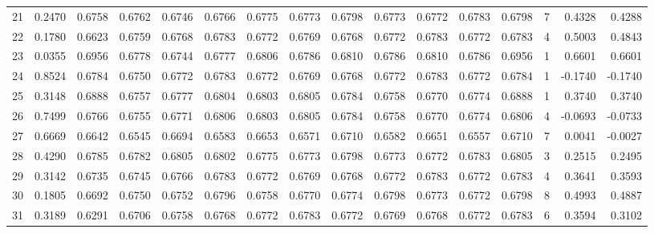 \begin{tabular}{lrrrrrrrrrrrrrrr}
21  &      0.2470 &  0.6758 &  0.6762 &  0.6746 &  0.6766 &  0.6775 &  0.6773 &  0.6798 &  0.6773 &  0.6772 &   0.6783 &     0.6798 &      7 &                    0.4328 &                     0.4288 \\
22  &      0.1780 &  0.6623 &  0.6759 &  0.6768 &  0.6783 &  0.6772 &  0.6769 &  0.6768 &  0.6772 &  0.6783 &   0.6772 &     0.6783 &      4 &                    0.5003 &                     0.4843 \\
23  &      0.0355 &  0.6956 &  0.6778 &  0.6744 &  0.6777 &  0.6806 &  0.6786 &  0.6810 &  0.6786 &  0.6810 &   0.6786 &     0.6956 &      1 &                    0.6601 &                     0.6601 \\
24  &      0.8524 &  0.6784 &  0.6750 &  0.6772 &  0.6783 &  0.6772 &  0.6769 &  0.6768 &  0.6772 &  0.6783 &   0.6772 &     0.6784 &      1 &                   -0.1740 &                    -0.1740 \\
25  &      0.3148 &  0.6888 &  0.6757 &  0.6777 &  0.6804 &  0.6803 &  0.6805 &  0.6784 &  0.6758 &  0.6770 &   0.6774 &     0.6888 &      1 &                    0.3740 &                     0.3740 \\
26  &      0.7499 &  0.6766 &  0.6755 &  0.6771 &  0.6806 &  0.6803 &  0.6805 &  0.6784 &  0.6758 &  0.6770 &   0.6774 &     0.6806 &      4 &                   -0.0693 &                    -0.0733 \\
27  &      0.6669 &  0.6642 &  0.6545 &  0.6694 &  0.6583 &  0.6653 &  0.6571 &  0.6710 &  0.6582 &  0.6651 &   0.6557 &     0.6710 &      7 &                    0.0041 &                    -0.0027 \\
28  &      0.4290 &  0.6785 &  0.6782 &  0.6805 &  0.6802 &  0.6775 &  0.6773 &  0.6798 &  0.6773 &  0.6772 &   0.6783 &     0.6805 &      3 &                    0.2515 &                     0.2495 \\
29  &      0.3142 &  0.6735 &  0.6745 &  0.6766 &  0.6783 &  0.6772 &  0.6769 &  0.6768 &  0.6772 &  0.6783 &   0.6772 &     0.6783 &      4 &                    0.3641 &                     0.3593 \\
30  &      0.1805 &  0.6692 &  0.6750 &  0.6752 &  0.6796 &  0.6758 &  0.6770 &  0.6774 &  0.6798 &  0.6773 &   0.6772 &     0.6798 &      8 &                    0.4993 &                     0.4887 \\
31  &      0.3189 &  0.6291 &  0.6706 &  0.6758 &  0.6768 &  0.6772 &  0.6783 &  0.6772 &  0.6769 &  0.6768 &   0.6772 &     0.6783 &      6 &                    0.3594 &                     0.3102 \\

\end{tabular}
